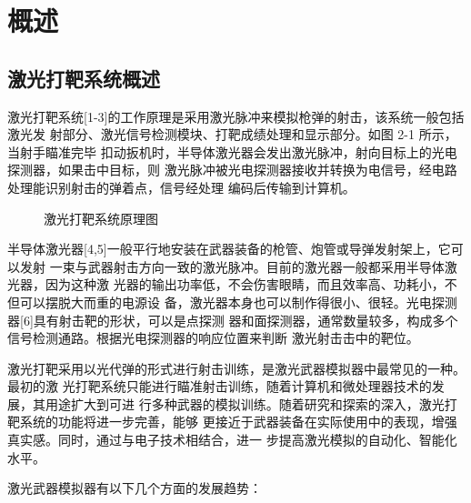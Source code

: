 \chapter{概述}

\section{激光打靶系统概述}

激光打靶系统[1-3]的工作原理是采用激光脉冲来模拟枪弹的射击，该系统一般包括激光发
射部分、激光信号检测模块、打靶成绩处理和显示部分。如图 2-1 所示，当射手瞄准完毕
扣动扳机时，半导体激光器会发出激光脉冲，射向目标上的光电探测器，如果击中目标，则
激光脉冲被光电探测器接收并转换为电信号，经电路处理能识别射击的弹着点，信号经处理
编码后传输到计算机。

\begin{figure}[htbp]
  \centering
  \caption{激光打靶系统原理图}
\end{figure}

半导体激光器[4,5]一般平行地安装在武器装备的枪管、炮管或导弹发射架上，它可以发射
一束与武器射击方向一致的激光脉冲。目前的激光器一般都采用半导体激光器，因为这种激
光器的输出功率低，不会伤害眼睛，而且效率高、功耗小，不但可以摆脱大而重的电源设
备，激光器本身也可以制作得很小、很轻。光电探测器[6]具有射击靶的形状，可以是点探测
器和面探测器，通常数量较多，构成多个信号检测通路。根据光电探测器的响应位置来判断
激光射击击中的靶位。

激光打靶采用以光代弹的形式进行射击训练，是激光武器模拟器中最常见的一种。最初的激
光打靶系统只能进行瞄准射击训练，随着计算机和微处理器技术的发展，其用途扩大到可进
行多种武器的模拟训练。随着研究和探索的深入，激光打靶系统的功能将进一步完善，能够
更接近于武器装备在实际使用中的表现，增强真实感。同时，通过与电子技术相结合，进一
步提高激光模拟的自动化、智能化水平。

激光武器模拟器有以下几个方面的发展趋势：

